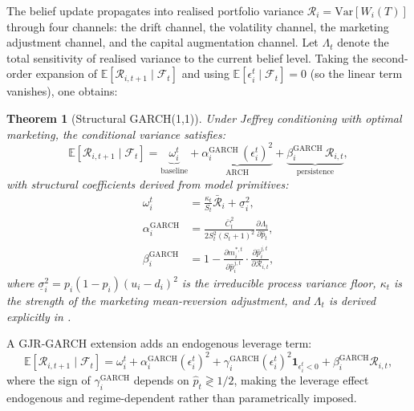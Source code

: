 \documentclass[12pt,a4paper]{article}
\newtheorem{theorem}{Theorem}
\newcommand{\E}{\mathbb{E}}
\newcommand{\Var}{\mathrm{Var}}
\newcommand{\1}{\mathbf{1}}
\begin{document}
The belief update propagates into realised portfolio variance
$\mathcal{R}_i = \Var[W_i(T)]$ through four channels: the drift
channel, the volatility channel, the marketing adjustment channel,
and the capital augmentation channel. Let $\Lambda_t$ denote the
total sensitivity of realised variance to the current belief level.
Taking the second-order expansion of
$\E[\mathcal{R}_{i,t+1} \mid \mathcal{F}_t]$ and using
$\E[\epsilon_i^t \mid \mathcal{F}_t] = 0$ (so the linear term
vanishes), one obtains:

\begin{theorem}[Structural GARCH(1,1)]
\label{thm:garch}
Under Jeffrey conditioning with optimal marketing, the conditional
variance satisfies:
\begin{equation}
  \E[\mathcal{R}_{i,t+1} \mid \mathcal{F}_t]
  = \underbrace{\omega_i^t}_{\text{baseline}}
  + \underbrace{\alpha_i^{\mathrm{GARCH}}\,(\epsilon_i^t)^2}_{\text{ARCH}}
  + \underbrace{\beta_i^{\mathrm{GARCH}}\,\mathcal{R}_{i,t}}_{\text{persistence}},
  \label{eq:garch11}
\end{equation}
with structural coefficients derived from model primitives:
\begin{align}
  \omega_i^t &= \frac{\kappa_t}{S_t}\bar{\mathcal{R}}_i
                + \underline{\sigma}_i^2,
  \label{eq:omega}\\
  \alpha_i^{\mathrm{GARCH}}
    &= \frac{\bar{C}_t^2}{2S_t^2(S_t+1)^2}
       \frac{\partial\Lambda_t}{\partial\hat{p}_t},
  \label{eq:alpha_garch}\\
  \beta_i^{\mathrm{GARCH}}
    &= 1
       - \frac{\partial m_i^{*,t}}{\partial\hat{p}_i^{j,t}}
       \cdot
       \frac{\partial\hat{p}_i^{j,t}}{\partial\mathcal{R}_{i,t}},
  \label{eq:beta_garch}
\end{align}
where $\underline{\sigma}_i^2 = p_i(1-p_i)(u_i-d_i)^2$ is the
irreducible process variance floor, $\kappa_t$ is the strength
of the marketing mean-reversion adjustment, and $\Lambda_t$ is
derived explicitly in \citet{Rana2025}.
\end{theorem}

A GJR-GARCH extension adds an endogenous leverage term:
\begin{equation}
  \E[\mathcal{R}_{i,t+1} \mid \mathcal{F}_t]
  = \omega_i^t
  + \alpha_i^{\mathrm{GARCH}}(\epsilon_i^t)^2
  + \gamma_i^{\mathrm{GARCH}}(\epsilon_i^t)^2
    \1_{\epsilon_i^t < 0}
  + \beta_i^{\mathrm{GARCH}}\mathcal{R}_{i,t},
  \label{eq:gjr}
\end{equation}
where the sign of $\gamma_i^{\mathrm{GARCH}}$ depends on
$\hat{p}_t \gtrless 1/2$, making the leverage effect endogenous
and regime-dependent rather than parametrically imposed.
\end{document}
